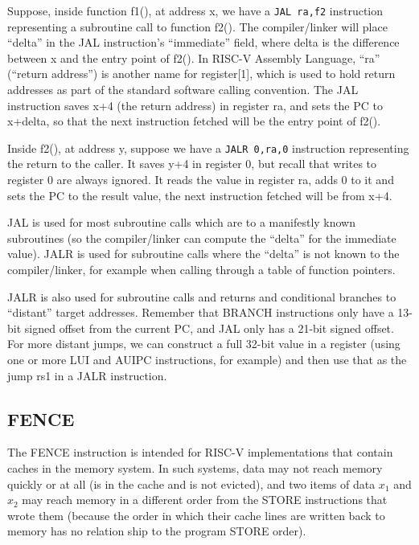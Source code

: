 Suppose, inside function f1(), at address x, we have a {\tt JAL ra,f2}
instruction representing a subroutine call to function f2().  The
compiler/linker will place ``delta'' in the JAL instruction's
``immediate'' field, where delta is the difference between x and the
entry point of f2().  In RISC-V Assembly Language, ``ra'' (``return
address'') is another name for register[1], which is used to hold
return addresses as part of the standard software calling convention.
The JAL instruction saves x+4 (the return address) in register ra, and
sets the PC to x+delta, so that the next instruction fetched will be
the entry point of f2().

Inside f2(), at address y, suppose we have a {\tt JALR 0,ra,0}
instruction representing the return to the caller.  It saves y+4 in
register 0, but recall that writes to register 0 are always ignored.
It reads the value in register ra, adds 0 to it and sets the PC to the
result value, {\ie} the next instruction fetched will be from x+4.

JAL is used for most subroutine calls which are to a manifestly known
subroutines (so the compiler/linker can compute the ``delta'' for the
immediate value).  JALR is used for subroutine calls where the
``delta'' is not known to the compiler/linker, for example when
calling through a table of function pointers.

JALR is also used for subroutine calls and returns and conditional
branches to ``distant'' target addresses.  Remember that BRANCH
instructions only have a 13-bit signed offset from the current PC, and
JAL only has a 21-bit signed offset.  For more distant jumps, we can
construct a full 32-bit value in a register (using one or more LUI and
AUIPC instructions, for example) and then use that as the jump rs1 in
a JALR instruction.


\subsection{FENCE}

\label{Sec_FENCE}

The FENCE instruction is intended for RISC-V implementations that
contain caches in the memory system.  In such systems, data may not
reach memory quickly or at all (is in the cache and is not evicted),
and two items of data $x_1$ and $x_2$ may reach memory in a different
order from the STORE instructions that wrote them (because the order
in which their cache lines are written back to memory has no relation
ship to the program STORE order).

